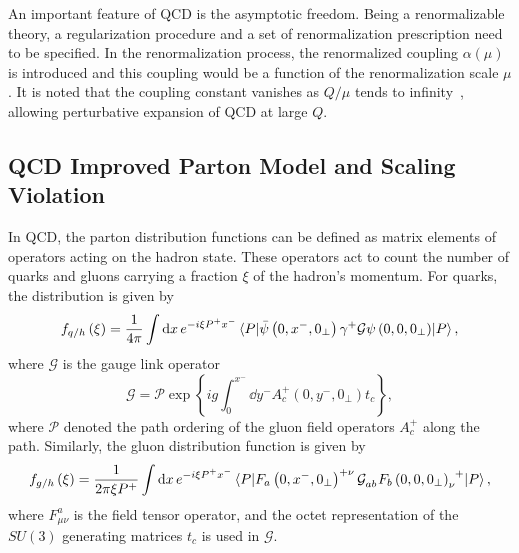 \documentclass[../main.tex]{subfiles}
\begin{document}
An important feature of QCD is the asymptotic freedom. Being a renormalizable
theory, a regularization procedure and a set of renormalization prescription
need to be specified. In the renormalization process, the renormalized coupling $\alpha(\mu)$
is introduced and this coupling would be a function of the renormalization scale $\mu$.
It is noted that the coupling constant vanishes as $Q/\mu$ tends to infinity~\cite{gross1973,politzer1973},
allowing perturbative expansion of QCD at large $Q$.


\subsection{QCD Improved Parton Model and Scaling Violation}
\label{subsec:scaling_violation}
In QCD, the parton distribution functions can be defined as matrix elements of
operators acting on the hadron state. These operators act to count the number of
quarks and gluons carrying a fraction $\xi$ of the hadron's momentum. For quarks,
the distribution is given by~\cite{collins1989}
\begin{equation}
	f_{q/h}\left(\xi\right) = \frac{1}{4\pi}\int \dd{x} e^{-i\xi P^{+} x^{-}} \mel{P}{\bar{\psi}\left(0,x^-,0_\perp\right)\gamma^+ \mathcal{G} \psi\left(0,0,0_\perp\right)}{P},
\end{equation}
where $\mathcal{G}$ is the gauge link operator
\begin{equation}
	\mathcal{G}=\mathcal{P} \exp \left\{ ig\int_0^{x^-}\dd{y^-} A_c^+ \left(0,y^-,0_\perp\right)t_c\right\},
\end{equation}
where $\mathcal{P}$ denoted the path ordering of the gluon field operators $A_c^+$
along the path. Similarly, the gluon distribution function is given by
\begin{equation}
	f_{g/h}\left(\xi\right) = \frac{1}{2\pi\xi P^+}\int \dd{x} e^{-i\xi P^{+} x^{-}} \mel{P}{\tensor{F_a\left(0,x^-,0_\perp\right)}{^+^\nu} \tensor{\mathcal{G}}{_a_b} \tensor{F_b\left(0,0,0_\perp\right)}{_\nu^+}}{P},
\end{equation}
where $F^a_{\mu\nu}$ is the field tensor operator, and the octet representation of the $SU(3)$
generating matrices $t_c$ is used in $\mathcal{G}$.
\end{document}
